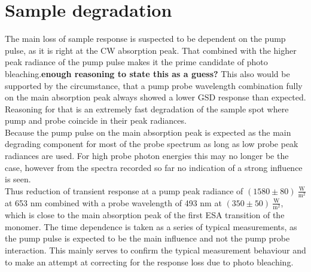 \documentclass[twoside,openright]{scrreprt}
\begin{document}
\section{Sample degradation}
The main loss of sample response is suspected to be dependent on the pump pulse, as it is right at the CW absorption peak. That combined with the higher peak radiance of the pump pulse makes it the prime candidate of photo bleaching.\textbf{enough reasoning to state this as a guess?} This also would be supported by the circumstance, that a pump probe wavelength combination fully on the main absorption peak always showed a lower GSD response than expected. Reasoning for that is an extremely fast degradation of the sample spot where pump and probe coincide in their peak radiances.\\
Because the pump pulse on the main absorption peak is expected as the main degrading component for most of the probe spectrum as long as low probe peak radiances are used. For high probe photon energies this may no longer be the case, however from the spectra recorded so far no indication of a strong influence is seen.\\
Thus reduction of transient response at a pump peak radiance of $\mathrm{(1580\pm 80) \ \frac{W}{m^2}}$ at 653 nm combined with a probe wavelength of 493 nm at $\mathrm{(350 \pm 50)\ \frac{W}{m^2}}$, which is close to the main absorption peak of the first ESA transition of the monomer. The time dependence is taken as a series of typical measurements, as the pump pulse is expected to be the main influence and not the pump probe interaction. This mainly serves to confirm the typical measurement behaviour and to make an attempt at correcting for the response loss due to photo bleaching.
\end{document}
